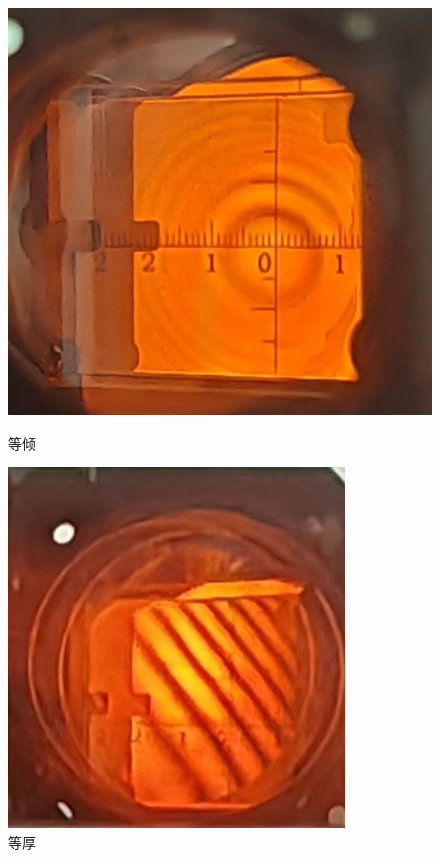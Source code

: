 \documentclass[signature=data]{physicsreport}
\begin{document}
\begin{enumerate}
    \begin{figure}[H]
	\centering
	\begin{minipage}{0.39\linewidth}
		\centering
		\includegraphics[width=0.9\linewidth]{images/lab1/等倾.jpg}
		\caption{等倾}
		\label{chutian1}%
	\end{minipage}
	\begin{minipage}{0.35\linewidth}
		\centering
		\includegraphics[width=0.9\linewidth]{images/lab1/等厚.jpg}
		\caption{等厚}
		\label{chutian2}%
	\end{minipage}
    \end{figure}


\end{enumerate}
\end{document}
